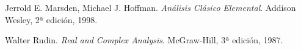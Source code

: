 \documentclass[11pt, a4paper]{article}
\theoremstyle{theorem-style}
\theoremstyle{definition-style}
\theoremstyle{remark-style}
\theoremstyle{example-style}
\begin{document}
\newpage

\begin{thebibliography}{9}

  Jerrold E. Marsden, Michael  J. Hoffman.
  \emph{Análisis Clásico Elemental}.
  Addison Wesley,
  2ª edición,
  1998.

  Walter Rudin.
  \emph{Real and Complex Analysis}.
  McGraw-Hill,
  3ª edición,
  1987.

\end{thebibliography}



\end{document}
